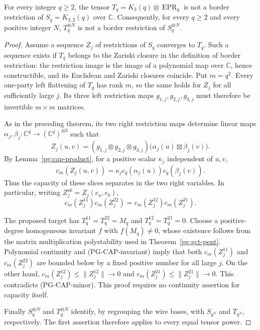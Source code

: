 \begin{theorem}
\label{pg:cap-pent}
For every integer $q\geq2$, the tensor
$T_q=K_3(q)\otimes\operatorname{EPR}_q$ is not a border restriction
of $S_q=K_{3,2}(q)$ over $\mathbb C$.
Consequently, for every $q\geq2$ and every positive integer $N$,
$T_q^{\otimes N}$ is not a border restriction of $S_q^{\otimes N}$.
\end{theorem}
\begin{proof}
Assume a sequence $Z_j$ of restrictions of $S_q$ converges to $T_q$.
Such a sequence exists if $T_q$ belongs to the Zariski closure in
the definition of border restriction: the restriction image is the
image of a polynomial map over $\mathbb C$, hence constructible,
and its Euclidean and Zariski closures coincide. Put $m=q^2$.
Every one-party left flattening of $T_q$ has rank $m$, so the same
holds for $Z_j$ for all sufficiently large $j$. Its three left
restriction maps $g_{1,j},g_{2,j},g_{3,j}$ must therefore be
invertible $m\times m$ matrices.

As in the preceding theorem, its two right restriction maps determine
linear maps $\alpha_j,\beta_j:\mathbb C^q\to
(\mathbb C^q)^{\otimes3}$ such that
\[
 Z_j(u,v)=(g_{1,j}\otimes g_{2,j}\otimes g_{3,j})
       \bigl(\alpha_j(u)\boxtimes\beta_j(v)\bigr).
\]
By Lemma~\ref{pg:cap-product}, for a positive scalar $\kappa_j$
independent of $u,v$,
\[
 c_m(Z_j(u,v))=\kappa_j c_q(\alpha_j(u))c_q(\beta_j(v)).
\]
Thus the capacity of these slices separates in the two right
variables. In particular, writing $Z_j^{ab}=Z_j(e_a,e_b)$,
\[
 c_m(Z_j^{11})c_m(Z_j^{22})
 =c_m(Z_j^{12})c_m(Z_j^{21}).
 \tag{PG-CAP-minor}
\]

The proposed target has $T_q^{11}=T_q^{22}=M_q$ and
$T_q^{12}=T_q^{21}=0$. Choose a positive-degree homogeneous
invariant $f$ with $f(M_q)\ne0$, whose existence follows from the
matrix multiplication polystability used in
Theorem~\ref{pg:gct-pent}. Polynomial continuity and
(PG-CAP-invariant) imply that both $c_m(Z_j^{11})$ and
$c_m(Z_j^{22})$ are bounded below by a fixed positive number for
all large $j$. On the other hand,
$c_m(Z_j^{12})\leq\|Z_j^{12}\|\to0$ and
$c_m(Z_j^{21})\leq\|Z_j^{21}\|\to0$. This contradicts
(PG-CAP-minor). This proof requires no continuity assertion for
capacity itself.

Finally $S_q^{\otimes N}$ and $T_q^{\otimes N}$ identify, by
regrouping the wire bases, with $S_{q^N}$ and $T_{q^N}$,
respectively. The first assertion therefore applies to every
equal tensor power.
\end{proof}


